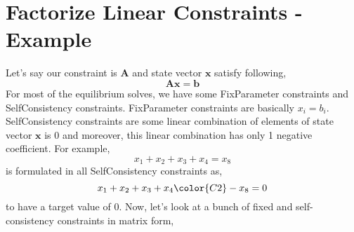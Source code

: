 

\section{Factorize Linear Constraints - Example} \label{appendix-factorize}
Let's say our constraint is $\mathbf{A}$ and state vector $\mathbf{x}$ satisfy following,
\begin{equation*}
    \mathbf{A}\mathbf{x} = \mathbf{b}
\end{equation*}
For most of the equilibrium solves, we have some FixParameter constraints and SelfConsistency constraints. FixParameter constraints are basically $x_i = b_i$. SelfConsistency constraints are some linear combination of elements of state vector $\mathbf{x}$ is 0 and moreover, this linear combination has only 1 negative coefficient. For example,
\begin{equation*}
    x_1 + x_2 + x_3 + x_4 = x_8
\end{equation*}
is formulated in all SelfConsistency constraints as,
\begin{equation*}
    x_1 + x_2 + x_3 + x_4 {\color{C2}- x_8} = 0
\end{equation*}
to have a target value of 0. Now, let's look at a bunch of fixed and self-consistency constraints in matrix form,
